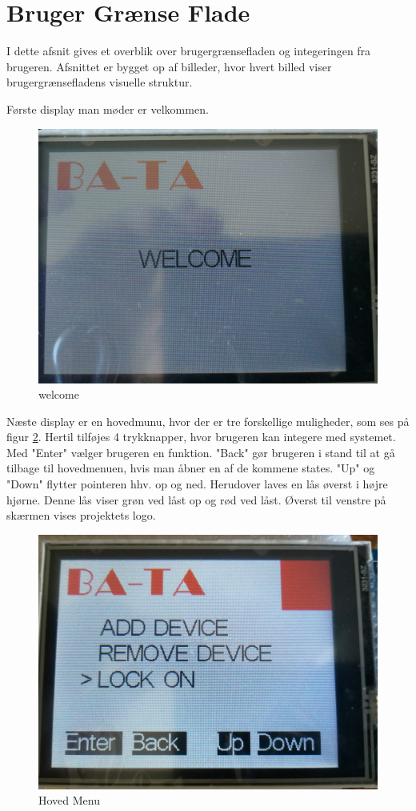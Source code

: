 \graphicspath{{Chapters/Userinterface/}}


\section{Bruger Grænse Flade}
I dette afsnit gives et overblik over brugergrænsefladen og integeringen fra brugeren. Afsnittet er bygget op af billeder, hvor hvert billed viser brugergrænsefladens visuelle struktur. 

Første display man møder er velkommen. 
\begin{figure}[H]
	\centering
	\includegraphics[width = 300 pt]{Img/welcome.jpg}
	\caption{welcome}
	\label{fig:welcome}
\end{figure}
Næste display er en hovedmunu, hvor der er tre forskellige muligheder, som ses på \\figur     \ref{fig:start}. Hertil tilføjes 4 trykknapper, hvor brugeren kan integere med systemet. Med "Enter" vælger brugeren en funktion. "Back" gør brugeren i stand til at gå tilbage til hovedmenuen, hvis man åbner en af de kommene states. "Up" og "Down" flytter pointeren hhv. op og ned. Herudover laves en lås øverst i højre hjørne. Denne lås viser grøn ved låst op og rød ved låst. Øverst til venstre på skærmen vises projektets logo.    
\begin{figure}[H]
	\centering
	\includegraphics[width = 300 pt]{Img/start.jpg}
	\caption{Hoved Menu}
	\label{fig:start}
\end{figure}

